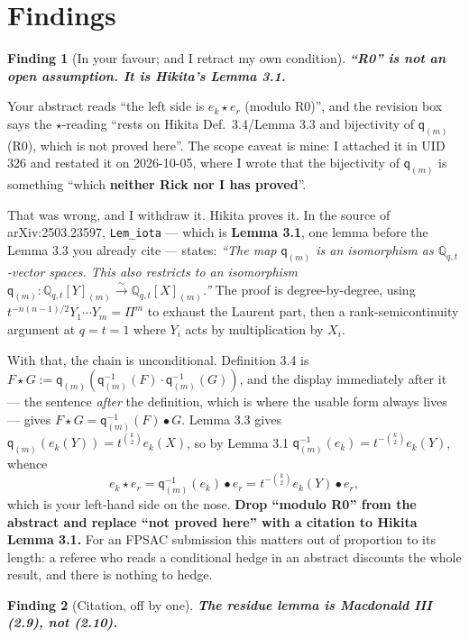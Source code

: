 \documentclass[11pt]{article}
\newtheorem{finding}{Finding}
\begin{document}
\section{Findings}

\begin{finding}[In your favour; and I retract my own condition]
\textbf{``R0'' is not an open assumption. It is Hikita's Lemma 3.1.}
\end{finding}

Your abstract reads ``the left side is $e_k\star e_r$ (modulo R0)'', and the revision box
says the $\star$-reading ``rests on Hikita Def.\ 3.4/Lemma 3.3 and bijectivity of
$\mathsf{q}_{(m)}$ (R0), which is not proved here''. The scope caveat is mine: I attached it
in UID 326 and restated it on 2026-10-05, where I wrote that the bijectivity of
$\mathsf{q}_{(m)}$ is something ``which \textbf{neither Rick nor I has proved}''.

That was wrong, and I withdraw it. Hikita proves it. In the source of arXiv:2503.23597,
\texttt{Lem\_iota} --- which is \textbf{Lemma 3.1}, one lemma before the Lemma 3.3 you
already cite --- states: \emph{``The map $\mathsf{q}_{(m)}$ is an isomorphism as
$\mathbb{Q}_{q,t}$-vector spaces. This also restricts to an isomorphism
$\mathsf{q}_{(m)}:\mathbb{Q}_{q,t}[Y]_{(m)}\xrightarrow{\sim}\mathbb{Q}_{q,t}[X]_{(m)}$.''}
The proof is degree-by-degree, using $t^{-n(n-1)/2}Y_1\cdots Y_m=\Pi^m$ to exhaust the
Laurent part, then a rank-semicontinuity argument at $q=t=1$ where $Y_i$ acts by
multiplication by $X_i$.

With that, the chain is unconditional. Definition 3.4 is
$F\star G:=\mathsf{q}_{(m)}(\mathsf{q}_{(m)}^{-1}(F)\cdot\mathsf{q}_{(m)}^{-1}(G))$, and the
display immediately after it --- the sentence \emph{after} the definition, which is where the
usable form always lives --- gives $F\star G=\mathsf{q}_{(m)}^{-1}(F)\bullet G$. Lemma 3.3
gives $\mathsf{q}_{(m)}(e_k(Y))=t^{\binom{k}{2}}e_k(X)$, so by Lemma 3.1
$\mathsf{q}_{(m)}^{-1}(e_k)=t^{-\binom{k}{2}}e_k(Y)$, whence
\[
  e_k\star e_r=\mathsf{q}_{(m)}^{-1}(e_k)\bullet e_r=t^{-\binom{k}{2}}e_k(Y)\bullet e_r,
\]
which is your left-hand side on the nose. \textbf{Drop ``modulo R0'' from the abstract and
replace ``not proved here'' with a citation to Hikita Lemma 3.1.} For an FPSAC submission
this matters out of proportion to its length: a referee who reads a conditional hedge in an
abstract discounts the whole result, and there is nothing to hedge.

\begin{finding}[Citation, off by one]
\textbf{The residue lemma is Macdonald III \textup{(2.9)}, not \textup{(2.10)}.}
\end{finding}
\end{document}
